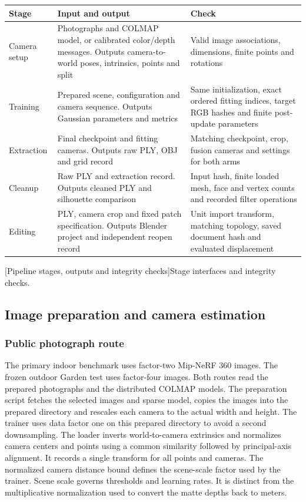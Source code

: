 \begin{center}\begin{minipage}{\linewidth}
\small\begin{tabularx}{\linewidth}{@{}p{.16\linewidth}YY@{}}
\toprule
\textbf{Stage} & \textbf{Input and output} & \textbf{Check}\\
\midrule
Camera setup & Photographs and COLMAP model, or calibrated color/depth messages. Outputs camera-to-world poses, intrinsics, points and split & Valid image associations, dimensions, finite points and rotations\\
Training & Prepared scene, configuration and camera sequence. Outputs Gaussian parameters and metrics & Same initialization, exact ordered fitting indices, target RGB hashes and finite post-update parameters\\
Extraction & Final checkpoint and fitting cameras. Outputs raw PLY, OBJ and grid record & Matching checkpoint, crop, fusion cameras and settings for both arms\\
Cleanup & Raw PLY and extraction record. Outputs cleaned PLY and silhouette comparison & Input hash, finite loaded mesh, face and vertex counts and recorded filter operations\\
Editing & PLY, camera crop and fixed patch specification. Outputs Blender project and independent reopen record & Unit import transform, matching topology, saved document hash and evaluated displacement\\
\bottomrule
\end{tabularx}\par
{}[Pipeline stages, outputs and integrity checks]{Stage interfaces and integrity checks.}\label{tab:interfaces}
\end{minipage}\end{center}

\subsection{Image preparation and camera estimation}\label{sec:acquisition}
\subsubsection{Public photograph route}
The primary indoor benchmark uses factor-two Mip-NeRF 360 images. The frozen outdoor Garden test uses factor-four images. Both routes read the prepared photographs and the distributed COLMAP models. The preparation script fetches the selected images and sparse model, copies the images into the prepared directory and rescales each camera to the actual width and height. The trainer uses data factor one on this prepared directory to avoid a second downsampling. The loader inverts world-to-camera extrinsics and normalizes camera centers and points using a common similarity followed by principal-axis alignment. It records a single transform for all points and cameras. The normalized camera distance bound defines the scene-scale factor used by the trainer. Scene scale governs thresholds and learning rates. It is distinct from the multiplicative normalization used to convert the matte depths back to meters.

